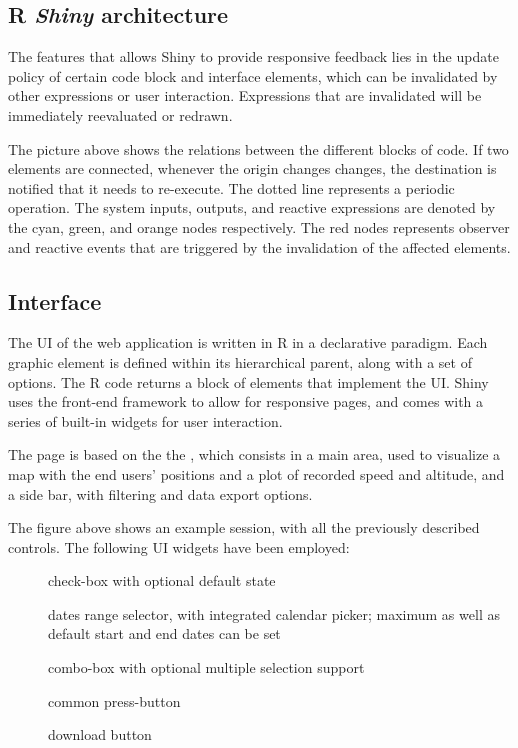 \subsection{R \emph{Shiny} architecture}
The features that allows Shiny to provide responsive feedback lies in the update policy of certain code block and interface elements, which can be invalidated by other expressions or user interaction.
Expressions that are invalidated will be immediately reevaluated or redrawn.


The picture above shows the relations between the different blocks of code.
If two elements are connected, whenever the origin changes changes, the destination is notified that it needs to re-execute.
The dotted line represents a periodic operation.
The system inputs, outputs, and reactive expressions are denoted by the cyan, green, and orange nodes respectively.
The red nodes represents observer and reactive events that are triggered by the invalidation of the affected elements.


\subsection{Interface}
The UI of the web application is written in R in a declarative paradigm.
Each graphic element is defined within its hierarchical parent, along with a set of options.
The R code returns a block of  elements that implement the UI.
Shiny uses the  front-end framework to allow for responsive pages, and comes with a series of built-in widgets for user interaction.

The page is based on the the , which consists in a main area, used to visualize a map with the end users' positions and a plot of recorded speed and altitude, and a side bar, with filtering and data export options.


The figure above shows an example session, with all the previously described controls.
The following UI widgets have been employed:

\begin{description}
	\item[] check-box with optional default state
	\item[] dates range selector, with integrated calendar picker; maximum as well as default start and end dates can be set
	\item[] combo-box with optional multiple selection support
	\item[] common press-button
	\item[] download button
\end{description}

